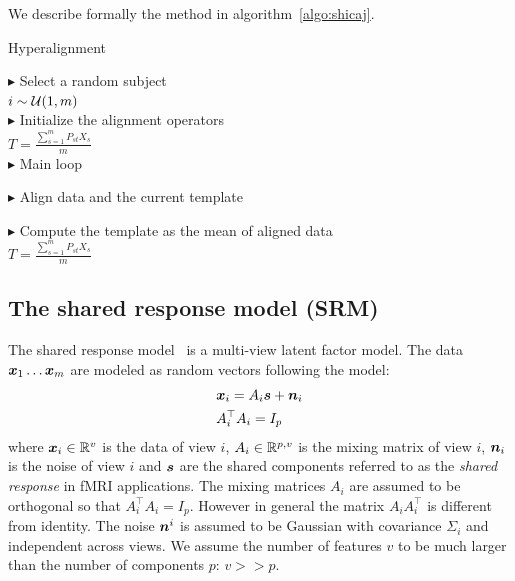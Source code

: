 We describe formally
the method in algorithm~\ref{algo:shicaj}.

\begin{algorithm}[H]
  \SetAlgoLined
  \caption{Hyperalignment}
  \label{algo:shicaj}
  $\blacktriangleright$ Select a random subject \\
  $i \sim \mathcal{U}(1, m)$ \\
  $\blacktriangleright$ Initialize the alignment operators \\
  $T = \frac{\sum_{s=1}^m P_{st} X_s}{m}$ \\

  $\blacktriangleright$ Main loop \\
  {
    $\blacktriangleright$ Align data and the current template \\

    $\blacktriangleright$ Compute the template as the mean of aligned data \\
    $T = \frac{\sum_{s=1}^m P_{st} X_s}{m}$ \\
    }
\end{algorithm}



\subsection{The shared response model (SRM)}
\label{sec:srm:review}
The shared response model~\cite{chen2015reduced} is a multi-view latent factor
model. The data $\boldsymbol{x}_1 \dots \boldsymbol{x}_m$ are modeled as random vectors following the model:
\begin{align}
 &\boldsymbol{x}_i = A_i \boldsymbol{s} + \boldsymbol{n}_i \\
  &A_i^{\top}A_i = I_p
  \label{eq:model:srm}
\end{align}
where $\boldsymbol{x}_i \in \mathbb{R}^v$ is the data of view $i$, $A_i \in \mathbb{R}^{p, v}$ is the
mixing matrix of view $i$, $\boldsymbol{n}_i$ is the noise of view $i$ and $\boldsymbol{s}$ are the
shared components referred to as the \emph{shared response} in fMRI applications.
The mixing matrices
$A_i$ are assumed to be orthogonal so that $A_i^{\top}A_i = I_p$. However in
general the matrix $A_i A_i^{\top}$ is different from identity. The noise
$\boldsymbol{n}^i$ is assumed to be Gaussian with covariance $\Sigma_i$ and independent
across views. We assume the number of features $v$ to be much larger than the
number of components $p$: $v >> p$.

